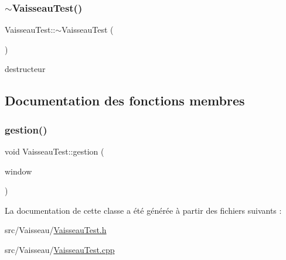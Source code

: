 \subsubsection{\texorpdfstring{$\sim$\+Vaisseau\+Test()}{~VaisseauTest()}}
{\footnotesize\ttfamily Vaisseau\+Test\+::$\sim$\+Vaisseau\+Test (\begin{DoxyParamCaption}{ }\end{DoxyParamCaption})}



destructeur 



\subsection{Documentation des fonctions membres}
\mbox{\label{class_vaisseau_test_acf5f5ea1e9317cbc5a4c445016cd767c}} 
\subsubsection{\texorpdfstring{gestion()}{gestion()}}
{\footnotesize\ttfamily void Vaisseau\+Test\+::gestion (\begin{DoxyParamCaption}\item[{sf\+::\+Render\+Window \&}]{window }\end{DoxyParamCaption})}



La documentation de cette classe a été générée à partir des fichiers suivants \+:\begin{DoxyCompactItemize}
\item 
src/\+Vaisseau/\hyperlink{_vaisseau_test_8h}{Vaisseau\+Test.\+h}\item 
src/\+Vaisseau/\hyperlink{_vaisseau_test_8cpp}{Vaisseau\+Test.\+cpp}\end{DoxyCompactItemize}
